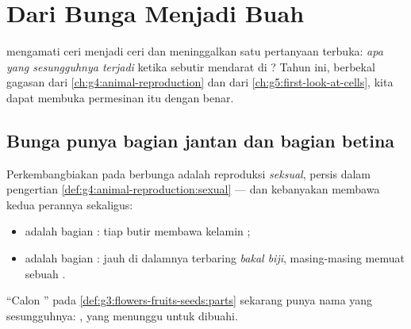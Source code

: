 \chapter{Dari Bunga Menjadi Buah}\label{ch:g5:flower-to-fruit}

 mengamati  ceri menjadi 
ceri dan meninggalkan satu pertanyaan terbuka: \emph{apa yang
sesungguhnya terjadi} ketika sebutir  mendarat di ?
Tahun ini, berbekal gagasan  dari
\cref{ch:g4:animal-reproduction} dan  dari
\cref{ch:g5:first-look-at-cells}, kita dapat membuka permesinan 
itu dengan benar.

\section{Bunga punya bagian jantan dan bagian betina}

\begin{proposition}\label{prop:g5:flower-to-fruit:roles}
Perkembangbiakan pada  berbunga adalah reproduksi
\emph{seksual}, persis dalam pengertian
\cref{def:g4:animal-reproduction:sexual} --- dan kebanyakan 
membawa kedua perannya sekaligus:
\begin{itemize}
  \item \emph{} adalah bagian : tiap butir
        \emph{} membawa  kelamin  ;
  \item \emph{} adalah bagian : jauh di dalamnya terbaring
        \emph{bakal biji}, masing-masing memuat
        sebuah .
\end{itemize}
``Calon '' pada \cref{def:g3:flowers-fruits-seeds:parts} sekarang
punya nama yang sesungguhnya: , yang menunggu untuk
dibuahi.
\end{proposition}
\admitted

